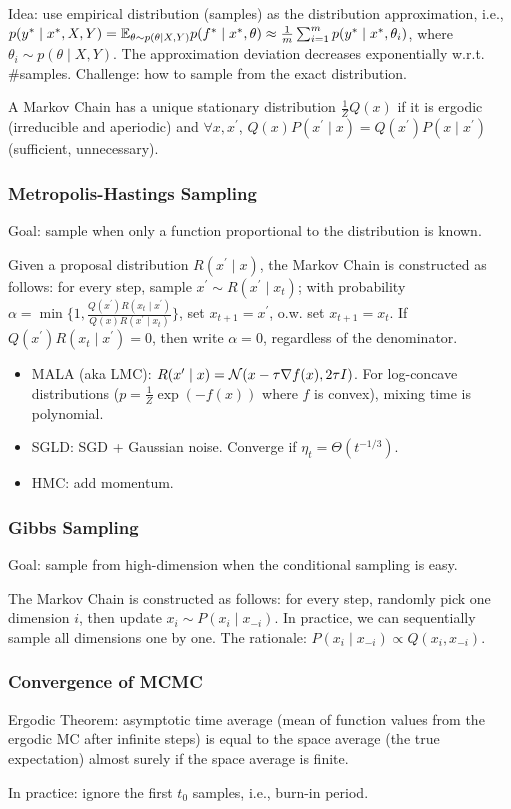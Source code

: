 Idea: use empirical distribution (samples) as the distribution approximation, i.e., $p(y^*\mid x^*, X, Y) = \mathbb{E}_{\theta\sim p(\theta\mid X,Y)} p(f^*\mid x^*,\theta)\approx \frac{1}{m} \sum_{i=1}^m p(y^*\mid x^*,\theta_i)$, where $\theta_i\sim p(\theta\mid X,Y)$. The approximation deviation decreases exponentially w.r.t. \#samples. Challenge: how to sample from the exact distribution.

A Markov Chain has a unique stationary distribution $\frac{1}{Z}Q(x)$ if it is ergodic (irreducible and aperiodic) and $\forall x, x^\prime$, $Q(x)P(x^\prime\mid x)=Q(x^\prime)P(x\mid x^\prime)$ (sufficient, unnecessary).

\subsubsection*{Metropolis-Hastings Sampling}

Goal: sample when only a function proportional to the distribution is known.

Given a proposal distribution $R(x^\prime\mid x)$, the Markov Chain is constructed as follows: for every step, sample $x^\prime \sim R(x^\prime\mid x_{t})$; with probability $\alpha=\min\{1, \frac{Q(x^\prime) R(x_t\mid x^\prime)}{Q(x)R(x^\prime\mid x_t)}\}$, set $x_{t+1}=x^\prime$, o.w. set $x_{t+1}=x_t$. If $Q(x^\prime) R(x_t\mid x^\prime)=0$, then write $\alpha=0$, regardless of the denominator.

\begin{itemize}
    \item MALA (aka LMC): $R(x^{\prime} \mid x)=\mathcal{N}(x-\tau \nabla f(x), 2 \tau I)$. For log-concave distributions ($p=\frac{1}{Z}\exp(-f(x))$ where $f$ is convex), mixing time is polynomial.
    \item SGLD: SGD + Gaussian noise. Converge if $\eta_t=\Theta(t^{-1/3})$.
    \item HMC: add momentum.
\end{itemize}


\subsubsection*{Gibbs Sampling}

Goal: sample from high-dimension when the conditional sampling is easy.

The Markov Chain is constructed as follows: for every step, randomly pick one dimension $i$, then update $x_i\sim P(x_i\mid x_{-i})$. In practice, we can sequentially sample all dimensions one by one. The rationale: $P(x_i\mid x_{-i})\propto Q(x_i, x_{-i})$.

\subsubsection*{Convergence of MCMC}

Ergodic Theorem: asymptotic time average (mean of function values from the ergodic MC after infinite steps) is equal to the space average (the true expectation) almost surely if the space average is finite.

In practice: ignore the first $t_0$ samples, i.e., burn-in period.